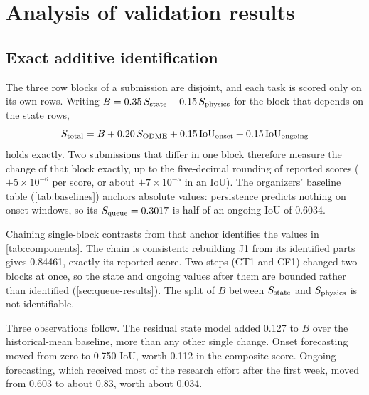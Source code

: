 \section{Analysis of validation results}\label{sec:leaderboard}

\subsection{Exact additive identification}
The three row blocks of a submission are disjoint, and each task is scored only on its own rows. Writing
$B=0.35\,S_{\mathrm{state}}+0.15\,S_{\mathrm{physics}}$ for the block that depends on the state rows,
\begin{equation}
  S_{\mathrm{total}} = B + 0.20\,S_{\mathrm{ODME}} + 0.15\,\mathrm{IoU}_{\mathrm{onset}} + 0.15\,\mathrm{IoU}_{\mathrm{ongoing}}
  \label{eq:additive}
\end{equation}
holds exactly. Two submissions that differ in one block therefore measure the change of that block exactly, up to
the five-decimal rounding of reported scores ($\pm5\times10^{-6}$ per score, or about $\pm7\times10^{-5}$ in an IoU).
The organizers' baseline table (\cref{tab:baselines}) anchors absolute values: persistence predicts nothing on onset
windows, so its $S_{\mathrm{queue}}=0.3017$ is half of an ongoing IoU of 0.6034.

Chaining single-block contrasts from that anchor identifies the values in \cref{tab:components}. The chain is
consistent: rebuilding J1 from its identified parts gives 0.84461, exactly its reported score. Two steps (CT1 and CF1)
changed two blocks at once, so the state and ongoing values after them are bounded rather than identified
(\cref{sec:queue-results}). The split of $B$ between $S_{\mathrm{state}}$ and $S_{\mathrm{physics}}$ is not identifiable.

\begin{table}[h]
\centering\small
\caption{Component values identified from validation scores through \cref{eq:additive}. Generated from the submission
record by .}\label{tab:components}

\end{table}

Three observations follow. The residual state model added 0.127 to $B$ over the historical-mean baseline, more than
any other single change. Onset forecasting moved from zero to 0.750 IoU, worth 0.112 in the composite score. Ongoing
forecasting, which received most of the research effort after the first week, moved from 0.603 to about 0.83, worth
about 0.034.

